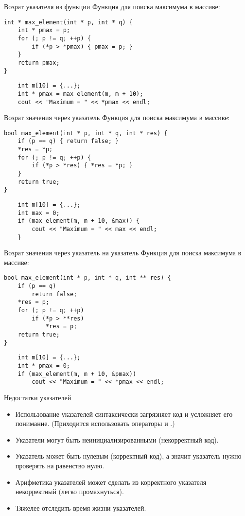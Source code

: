 \documentclass{beamer}
\begin{document}
\begin{frame}[fragile]{Возрат указателя из функции}
Функция для поиска максимума в массиве:
\begin{lstlisting}
int * max_element(int * p, int * q) {
    int * pmax = p;
    for (; p != q; ++p) {
        if (*p > *pmax) { pmax = p; }
    }
    return pmax;
}
\end{lstlisting}
\begin{lstlisting}
    int m[10] = {...};
    int * pmax = max_element(m, m + 10); 
    cout << "Maximum = " << *pmax << endl; 
\end{lstlisting}
\end{frame}

\begin{frame}[fragile]{Возрат значения через указатель}
Функция для поиска максимума в массиве:
\begin{lstlisting}
bool max_element(int * p, int * q, int * res) {
    if (p == q) { return false; }
    *res = *p;
    for (; p != q; ++p) {
        if (*p > *res) { *res = *p; }
    }
    return true;
}
\end{lstlisting}
\begin{lstlisting}
    int m[10] = {...};
    int max = 0;
    if (max_element(m, m + 10, &max)) {
        cout << "Maximum = " << max << endl;
    }
\end{lstlisting}
\end{frame}

\begin{frame}[fragile]{Возрат значения через указатель на указатель}
Функция для поиска максимума в массиве:
\begin{lstlisting}
bool max_element(int * p, int * q, int ** res) {
    if (p == q)
        return false;
    *res = p;
    for (; p != q; ++p)
        if (*p > **res)
            *res = p;
    return true;
}
\end{lstlisting}
\begin{lstlisting}
    int m[10] = {...};
    int * pmax = 0;
    if (max_element(m, m + 10, &pmax)) 
        cout << "Maximum = " << *pmax << endl; 
\end{lstlisting}
\end{frame}

\begin{frame}[fragile]{Недостатки указателей}
    \begin{itemize}
        \item Использование указателей синтаксически загрязняет код
            и усложняет его понимание.
            (Приходится использовать операторы \code{*} и \code{\&}.)
        \item Указатели могут быть неинициализированными (некорректный код).
        \item Указатель может быть нулевым (корректный код), 
            а значит указатель нужно проверять на равенство нулю.
        \item Арифметика указателей может сделать из корректного указателя
            некорректный (легко промахнуться).
        \item Тяжелее отследить время жизни указателей.
    \end{itemize}
\end{frame}
\end{document}
